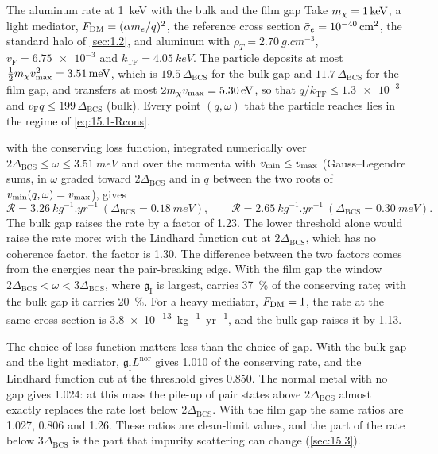 \begin{workedexample}{The aluminum rate at \SI{1}{keV} with the bulk and the film gap}\label{we:15-alrate}
Take $m_{\chi} = \SI{1}{keV}$, a light mediator, $F_{\mathrm{DM}} = (\alpha m_e/q)^2$, the reference cross section $\bar{\sigma}_{e} = \SI{e-40}{cm^2}$, the standard halo of \cref{sec:1.2}, and aluminum with $\rho_T = \SI{2.70}{g.cm^{-3}}$, $v_{\mathrm{F}} = \num{6.75e-3}$ and $k_{\mathrm{TF}} = \SI{4.05}{keV}$. The particle deposits at most $\frac12m_{\chi} v_{\mathrm{max}}^2 = \SI{3.51}{meV}$, which is $19.5\,\Delta_{\mathrm{BCS}}$ for the bulk gap and $11.7\,\Delta_{\mathrm{BCS}}$ for the film gap, and transfers at most $2m_{\chi} v_{\mathrm{max}} = \SI{5.30}{eV}$, so that $q/k_{\mathrm{TF}} \le \num{1.3e-3}$ and $v_{\mathrm{F}}q \le 199\,\Delta_{\mathrm{BCS}}$ (bulk). Every point $(q,\omega)$ that the particle reaches lies in the regime of \cref{eq:15.1-Rcons}.

 with the conserving loss function, integrated numerically over $2\Delta_{\mathrm{BCS}} \le \omega \le \SI{3.51}{meV}$ and over the momenta with $v_{\mathrm{min}} \le v_{\mathrm{max}}$ (Gauss--Legendre sums, in $\omega$ graded toward $2\Delta_{\mathrm{BCS}}$ and in $q$ between the two roots of $v_{\mathrm{min}}(q,\omega) = v_{\mathrm{max}}$), gives
\begin{equation*}
  \mathcal{R} = \SI{3.26}{kg^{-1}.yr^{-1}}\ (\Delta_{\mathrm{BCS}} = \SI{0.18}{meV}), \qquad
  \mathcal{R} = \SI{2.65}{kg^{-1}.yr^{-1}}\ (\Delta_{\mathrm{BCS}} = \SI{0.30}{meV}) .
\end{equation*}
The bulk gap raises the rate by a factor of 1.23. The lower threshold alone would raise the rate more: with the Lindhard function cut at $2\Delta_{\mathrm{BCS}}$, which has no coherence factor, the factor is 1.30. The difference between the two factors comes from the energies near the pair-breaking edge. With the film gap the window $2\Delta_{\mathrm{BCS}} < \omega < 3\Delta_{\mathrm{BCS}}$, where $\mathfrak{g}_{\mathrm{I}}$ is largest, carries \SI{37}{\percent} of the conserving rate; with the bulk gap it carries \SI{20}{\percent}. For a heavy mediator, $F_{\mathrm{DM}} = 1$, the rate at the same cross section is \SI{3.8e-13}{kg^{-1}.yr^{-1}}, and the bulk gap raises it by 1.13.

The choice of loss function matters less than the choice of gap. With the bulk gap and the light mediator, $\mathfrak{g}_{\mathrm{I}}L^{\mathrm{nor}}$ gives 1.010 of the conserving rate, and the Lindhard function cut at the threshold gives 0.850. The normal metal with no gap gives 1.024: at this mass the pile-up of pair states above $2\Delta_{\mathrm{BCS}}$ almost exactly replaces the rate lost below $2\Delta_{\mathrm{BCS}}$. With the film gap the same ratios are 1.027, 0.806 and 1.26. These ratios are clean-limit values, and the part of the rate below $3\Delta_{\mathrm{BCS}}$ is the part that impurity scattering can change (\cref{sec:15.3}).
\end{workedexample}
